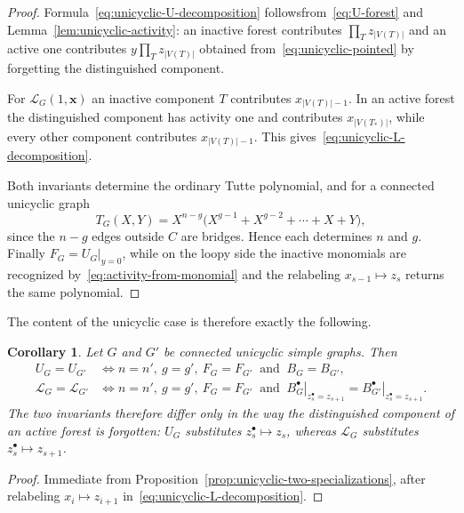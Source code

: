 \documentclass[11pt]{article}
\theoremstyle{plain}
\newtheorem{corollary}[theorem]{Corollary}
\theoremstyle{definition}
\renewcommand{\mathcal}{\mathscr}
\newcommand{\ds}{\displaystyle}
\newcommand{\LL}{\mathcal{L}}    %
\newcommand{\bx}{\mathbf{x}}
\numberwithin{equation}{section}
\begin{document}
\begin{proof}
Formula~\eqref{eq:unicyclic-U-decomposition} followsfrom~\eqref{eq:U-forest} and
Lemma~\ref{lem:unicyclic-activity}: an inactive forest contributes $\ds \prod_T z_{|V(T)|}$
and an active one contributes $\ds y\prod_T z_{|V(T)|}$ obtained from~\eqref{eq:unicyclic-pointed}
by forgetting the distinguished component.

For $\LL_G(1,\bx)$ an inactive component $T$ contributes $x_{|V(T)|-1}$.
In an active forest the distinguished component has activity one and contributes $x_{|V(T_*)|}$,
while every other component contributes $x_{|V(T)|-1}$.  This gives~\eqref{eq:unicyclic-L-decomposition}.

Both invariants determine the ordinary Tutte polynomial,
and for a connected unicyclic graph
\begin{equation}\label{eq:unicyclic-Tutte}
   T_G(X,Y)=X^{n-g}\bigl(X^{g-1}+X^{g-2}+\cdots+X+Y\bigr),
\end{equation}
since the $n-g$ edges outside $C$ are bridges.  Hence each determines $n$ and
$g$.  Finally $F_G=\left.U_G\right|_{y=0}$, while on the loopy side the
inactive monomials are recognized by~\eqref{eq:activity-from-monomial} and the
relabeling $x_{s-1}\mapsto z_s$ returns the same polynomial.
\end{proof}

The content of the unicyclic case is therefore exactly the following.

\begin{corollary}\label{cor:unicyclic-reduction}
Let $G$ and $G'$ be connected unicyclic simple graphs.  Then
\begin{align}
   U_G=U_{G'}
   &\iff
   n=n',\ g=g',\ F_G=F_{G'}\ \text{ and }\ B_G=B_{G'},
   \label{eq:unicyclic-U-iff}\\
   \LL_G=\LL_{G'}
   &\iff
   n=n',\ g=g',\ F_G=F_{G'}\ \text{ and }\
   \left.B_G^\bullet\right|_{z_s^\bullet=z_{s+1}}
   =\left.B_{G'}^\bullet\right|_{z_s^\bullet=z_{s+1}} .
   \label{eq:unicyclic-L-iff}
\end{align}
The two invariants therefore differ only in the way the distinguished
component of an active forest is forgotten: $U_G$ substitutes
$z^\bullet_s\mapsto z_s$, whereas $\LL_G$ substitutes
$z^\bullet_s\mapsto z_{s+1}$.
\end{corollary}

\begin{proof}
Immediate from Proposition~\ref{prop:unicyclic-two-specializations}, after
relabeling $x_i\mapsto z_{i+1}$ in~\eqref{eq:unicyclic-L-decomposition}.
\end{proof}
\end{document}
